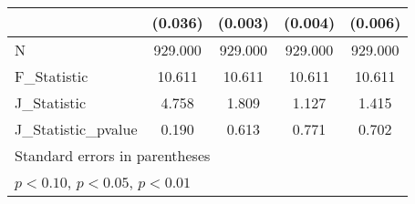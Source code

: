 {\begin{tabular}{l*{4}{c}}
            &     (0.036)         &     (0.003)         &     (0.004)         &     (0.006)         \\
\hline
N           &     929.000         &     929.000         &     929.000         &     929.000         \\
F\_Statistic &      10.611         &      10.611         &      10.611         &      10.611         \\
J\_Statistic &       4.758         &       1.809         &       1.127         &       1.415         \\
J\_Statistic\_pvalue&       0.190         &       0.613         &       0.771         &       0.702         \\
\hline\hline
\multicolumn{5}{l}{\footnotesize Standard errors in parentheses}\\
\multicolumn{5}{l}{\footnotesize \sym{*} \(p<0.10\), \sym{**} \(p<0.05\), \sym{***} \(p<0.01\)}\\
\end{tabular}
}
